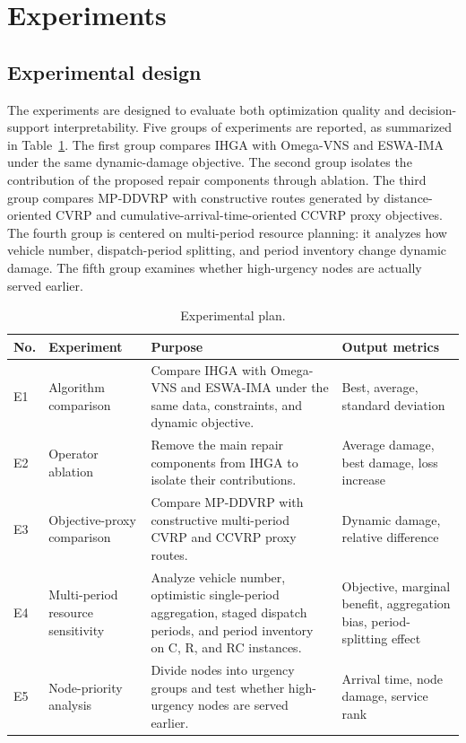 ﻿\documentclass[preprint,12pt,authoryear]{elsarticle}
\begin{document}
\section{Experiments}
\label{sec:experiments}

\subsection{Experimental design}
\label{subsec:experimental-design}

The experiments are designed to evaluate both optimization quality and decision-support interpretability. Five groups of experiments are reported, as summarized in Table~\ref{tab:experiment-plan}. The first group compares IHGA with Omega-VNS and ESWA-IMA under the same dynamic-damage objective. The second group isolates the contribution of the proposed repair components through ablation. The third group compares MP-DDVRP with constructive routes generated by distance-oriented CVRP and cumulative-arrival-time-oriented CCVRP proxy objectives. The fourth group is centered on multi-period resource planning: it analyzes how vehicle number, dispatch-period splitting, and period inventory change dynamic damage. The fifth group examines whether high-urgency nodes are actually served earlier.

\begin{table}[H]
\centering
\caption{Experimental plan.}
\label{tab:experiment-plan}
\small
\begin{tabularx}{\textwidth}{>{\raggedright\arraybackslash}p{}>{\raggedright\arraybackslash}p{}>{\raggedright\arraybackslash}X>{\raggedright\arraybackslash}p{}}
\toprule
No. & Experiment & Purpose & Output metrics \\
\midrule
E1 & Algorithm comparison & Compare IHGA with Omega-VNS and ESWA-IMA under the same data, constraints, and dynamic objective. & Best, average, standard deviation \\
E2 & Operator ablation & Remove the main repair components from IHGA to isolate their contributions. & Average damage, best damage, loss increase \\
E3 & Objective-proxy comparison & Compare MP-DDVRP with constructive multi-period CVRP and CCVRP proxy routes. & Dynamic damage, relative difference \\
E4 & Multi-period resource sensitivity & Analyze vehicle number, optimistic single-period aggregation, staged dispatch periods, and period inventory on C, R, and RC instances. & Objective, marginal benefit, aggregation bias, period-splitting effect \\
E5 & Node-priority analysis & Divide nodes into urgency groups and test whether high-urgency nodes are served earlier. & Arrival time, node damage, service rank \\
\bottomrule
\end{tabularx}
\end{table}
\end{document}
